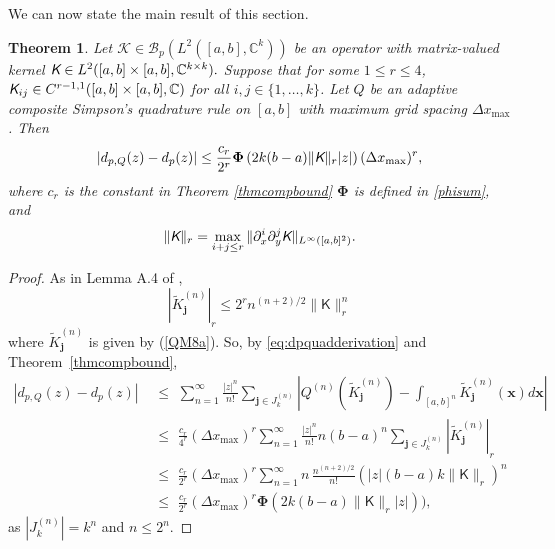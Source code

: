\documentclass{birkjour}
\newtheorem{thm}{Theorem}[section]
\theoremstyle{definition}
\theoremstyle{remark}
\numberwithin{equation}{section}
\newcommand{\cB}{{\mathcal B}}
\begin{document}
We can now state the main result of this section.



\begin{thm}\label{quadphibound}
Let $\mathcal{K}\in \cB_p(L^2([a,b],\mathbb{C}^k))$ be an operator with matrix-valued kernel $\emph{\textsf{K}} \in L^2([a,b]\times[a,b], \mathbb{C}^{k \times k}).$ Suppose that for some $1\leq r\leq 4$,
$\emph{\textsf{K}}_{ij} \in C^{r-1,1}([a,b] \times [a,b], \mathbb{C})$ for all $i,j \in \{1, \dots, k\}$.
Let $Q$ be an adaptive composite Simpson's quadrature rule on $[a,b]$ with maximum grid 
spacing $\Delta x_{\operatorname{max}}$. Then
\begin{equation}\label{quaderrest}
    |d_{p,Q}(z) - d_p(z)| \leq \frac{c_r}{2^r}  \boldsymbol{\Phi}\left(2k(b-a)\|\emph{\textsf{K}}\|_{r} |z|\right) (\Delta x_{\operatorname{max}})^r,
\end{equation}
where  $c_r$ is the constant in Theorem \ref{thmcompbound}  $ \boldsymbol{\Phi}$ is defined in \eqref{phisum}, and
\begin{equation}\label{newnorm}
\|\emph{\textsf{K}}\|_{r} = \max\limits_{i+j\leq r} \| \partial^i_x\partial^j_y \emph{\textsf K} \|_{L^\infty([a,b]^2)}.\end{equation}

\end{thm}

\begin{proof}
As in Lemma A.4 of \cite{Bornemann}, 
\begin{equation}
    \left| \widetilde{K}^{(n)}_{\mathbf{j}} \right|_r 
     \leq 2^r n^{(n+2)/2} \|\textsf{K}\|_{r}^n
\end{equation}
where $\widetilde{K}^{(n)}_{\mathbf{j}}$ is given by (\ref{QM8a}). 
So, by \eqref{eq:dpquadderivation} and Theorem~\ref{thmcompbound},
\begin{align}
|d_{p,Q}(z) - d_p(z)| 
&\,\,\leq\,\, 
 \sum\limits_{n=1}^{\infty} \frac{|z|^n}{n!} \sum\limits_{\mathbf{j} \in J^{(n)}_k} \left| Q^{(n)} (\widetilde{K}^{(n)}_{\mathbf{j}}) - \int_{[a,b]^n}\widetilde{K}^{(n)}_{\mathbf{j}}(\mathbf x) 
 d\mathbf x \right|
 \nonumber 
\\
&\,\,\leq\,\, \frac{c_r}{4^r}  (\Delta x_{\operatorname{max}})^r \sum_{n=1}^{\infty} \frac{|z|^n}{n!} 
n (b-a)^n \sum_{\mathbf{j} \in J^{(n)}_k} \left| \widetilde{K}^{(n)}_{\mathbf{j}} \right|_r
 \nonumber 
\\
&\,\,\leq\,\, \frac{c_r  }{2^r} ( \Delta x_{\operatorname{max}})^r
\sum_{n=1}^{\infty} n\,\frac{n^{(n+2)/2}}{n!} (|z|(b-a)k\|\textsf{K}\|_{r})^n
\nonumber
\\
&\,\,\leq\,\, \frac{c_r }{2^r} (\Delta x_{\operatorname{max}})^r \boldsymbol{\Phi}(2k(b-a)\|\textsf{K}\|_{r}|z|)),
\end{align}
as $|J^{(n)}_k| = k^n$ and $n \leq 2^n$.

\end{proof}
\end{document}
